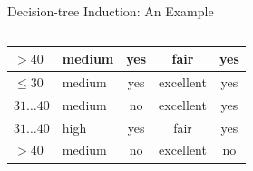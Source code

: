 \begin{frame}{Decision-tree Induction: An Example}
\begin{columns}
\begin{column}{0.6\textwidth}
\begin{tabular}{|l|l|c|c|c|}
        \cellcolor{yellow!20}$>40$ & \cellcolor{yellow!20}medium & \cellcolor{yellow!20}yes & \cellcolor{yellow!20}fair & \cellcolor{green!20}yes \\\hline
        \cellcolor{yellow!20}$\leq 30$ & \cellcolor{yellow!20}medium & \cellcolor{yellow!20}yes & \cellcolor{yellow!20}excellent & \cellcolor{green!20}yes \\\hline
        \cellcolor{yellow!20}$31\ldots40$ & \cellcolor{yellow!20}medium & \cellcolor{yellow!20}no & \cellcolor{yellow!20}excellent & \cellcolor{green!20}yes \\\hline
        \cellcolor{yellow!20}$31\ldots40$ & \cellcolor{yellow!20}high & \cellcolor{yellow!20}yes & \cellcolor{yellow!20}fair & \cellcolor{green!20}yes \\\hline
        \cellcolor{yellow!20}$>40$ & \cellcolor{yellow!20}medium & \cellcolor{yellow!20}no & \cellcolor{yellow!20}excellent & \cellcolor{red!20}no \\\hline
      \end{tabular}
    \end{column}
  \end{columns}
\end{frame}

